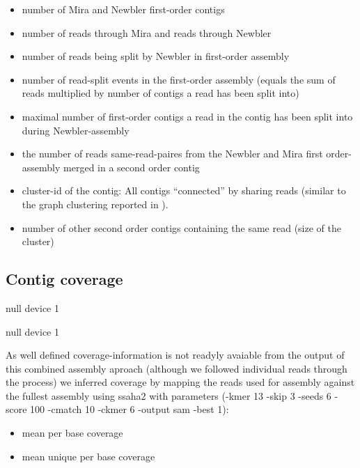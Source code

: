 \documentclass[12pt,a4paper]{article}
\begin{document}
\begin{itemize}
\item number of Mira and Newbler first-order contigs
\item number of reads through Mira and reads through Newbler
\item number of reads being split by Newbler in first-order assembly
\item number of read-split events in the first-order assembly (equals
  the sum of reads multiplied by number of contigs a read has been
  split into)
\item maximal number of first-order contigs a read in the contig has
  been split into during Newbler-assembly
\item the number of reads same-read-paires from the Newbler and Mira
  first order-assembly merged in a second order contig
\item cluster-id of the contig: All contigs ``connected'' by sharing
  reads (similar to the graph clustering reported in
  \cite{pmid21138572}). 
\item number of other second order contigs containing the same read
  (size of the cluster)
\end{itemize}





\subsection{Contig coverage}


\begin{Schunk}
\begin{Soutput}
null device 
          1 
\end{Soutput}
\begin{Soutput}
null device 
          1 
\end{Soutput}
\end{Schunk}

As well defined coverage-information is not readyly avaiable from the
output of this combined assembly aproach (although we followed
individual reads through the process) we inferred coverage by mapping
the reads used for assembly against the fullest assembly using ssaha2
\cite{pmid11591649} with parameters (-kmer 13 -skip 3 -seeds 6 -score
100 -cmatch 10 -ckmer 6 -output sam -best 1):

\begin{itemize}
\item mean per base coverage
\item mean unique per base coverage
\end{itemize}
\end{document}
